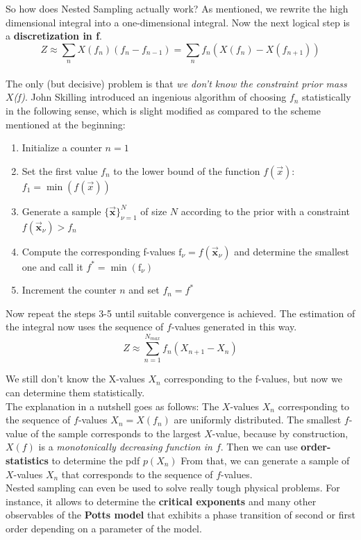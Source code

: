 \documentclass[12pt, a4paper]{scrartcl}
\begin{document}
So how does Nested Sampling actually work?
As mentioned, we rewrite the high dimensional integral into a one-dimensional integral.
Now the next logical step is a  \textbf{discretization in f}.\\%
\begin{equation*}\boxed{Z\approx\sum_nX(f_n)(f_n-f_{n-1})=\sum_nf_n(X(f_n)-X(f_{n+1}))
}\end{equation*}\\
The only (but decisive) problem is that \textit{we don’t know the constraint prior mass
$X$(f)}. John Skilling introduced an ingenious algorithm of choosing $f_n$ statistically in the following sense, which is slight modified as compared to the
scheme mentioned at the beginning:
\begin{enumerate}
\item Initialize a counter $n = 1$
\item Set the first value $f_n$ to the lower bound of the function $f(\vec x)$: $f_1=\min(f(\vec x))$
\item Generate a sample $\{\vec{\boldsymbol{x}}\}_{\nu=1}^N$ of size $N$ according to the prior with a
constraint $f(\vec{\boldsymbol{x}}_{\nu}) > f_n$
\item Compute the corresponding f-values $\text{f}_{\nu}=f(\vec{\boldsymbol{x}}_{\nu})$ and determine the smallest
one and call it $f^*=\min(\text{f}_{\nu})$
\item Increment the counter $n$ and set $f_n=f^*$
\end{enumerate}
Now repeat the steps 3-5 until suitable convergence is achieved.
The estimation of the integral now uses the sequence of $f$-values generated in
this way.
\[Z\approx\sum_{n=1}^{N_{max}}f_n(X_{n+1}-X_n)\]

We still don’t know the X-values $X_n$ corresponding to the f-values, but
now we can determine them statistically.\\

The explanation in a nutshell goes as follows: The $X$-values $X_n$ corresponding to the sequence of $f$-values $X_n=X(f_n)$ are uniformly distributed. The smallest
$f$-value of the sample corresponds to the largest $X$-value, because by construction, $X(f)$ is a \textit{monotonically decreasing function in $f$}. Then we can use
 \textbf{order-statistics} to determine the pdf $p(X_n)$ From that, we can generate a
sample of $X$-values $X_n$ that corresponds to the sequence of $f$-values.\\

Nested sampling can even be used to solve really tough physical problems.
For instance, it allows to determine the  \textbf{critical exponents} and many other observables
of the  \textbf{Potts model} that exhibits a phase transition of second or first order
depending on a parameter of the model.\\
\end{document}
